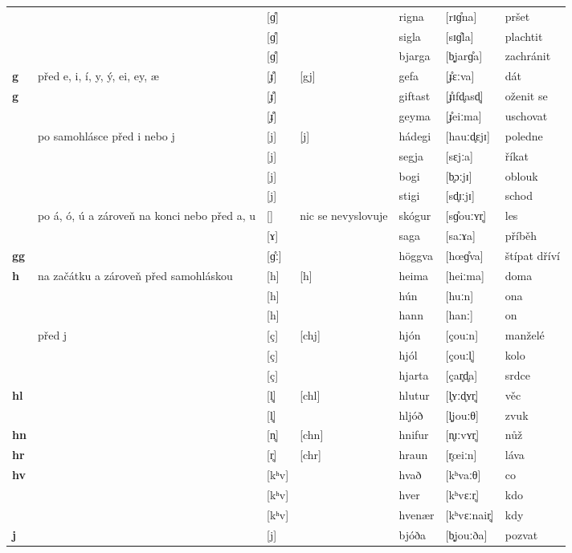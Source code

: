 \begin{longtable}{>{\bfseries}lX>{\IPAfont}lXl>{\IPAfont}ll}
 &  & {[ɡ̊]} &  & rigna & {[rɪɡ̊na]} & pršet \\ 
 &  & {[ɡ̊]} &   & sigla & {[sɪɡ̊la]} & plachtit \\ 
 &  & {[ɡ̊]} &   & bjarga & {[b̥jarɡ̊a]} & zachránit \\ 
g  & před e, i, í, y, ý, ei, ey, æ & {[\r ɟ]} & [gj] & gefa & {[\r ɟɛːva]} & dát \\ 
g &  & {[\r ɟ]} &   & giftast & {[\r ɟɪfd̥asd̥]} & oženit se \\ 
 &  & {[\r ɟ]} &   & geyma & {[\r ɟeiːma]} & uschovat \\ 
 & po samohlásce před i nebo j & {[j]} & [j] & hádegi & {[hauːd̥ɛjɪ]} & poledne \\ 
 &  & {[j]} &   & segja & {[sɛjːa]} & říkat \\ 
 &  & {[j]} &   & bogi & {[b̥ɔːjɪ]} & oblouk \\ 
 &  & {[j]} &   & stigi & {[sd̥ɪːjɪ]} & schod \\ 
 & po á, ó, ú a zároveň na konci nebo před a, u & {[]} & nic se nevyslovuje & skógur & {[sɡ̊ouːʏr̥]} & les \\ 
 &  & {[ɤ]} &   & saga & {[saːɤa]} & příběh \\ 
gg &  & {[ɡ̊ː]} &   & höggva & {[h\oe ɡ̊va]} & štípat dříví \\ 
h & na začátku a zároveň před samohláskou & {[h]} & [h] & heima & {[heiːma]} & doma \\ 
 &  & {[h]} &   & hún & {[huːn]} & ona \\ 
 &  & {[h]} &   & hann & {[hanː]} & on  \\ 
 & před j & {[ç]} & [chj] & hjón & {[çouːn]} & manželé \\ 
 &  & {[ç]} &  & hjól & {[çouːl̥]} & kolo \\ 
 &  & {[ç]} &  & hjarta & {[çar̥d̥a]} & srdce \\ 
hl &  & {[l̥]} & [chl] & hlutur & {[l̥ʏːd̥ʏr̥]} & věc \\ 
 &  & {[l̥]} &  & hljóð & {[l̥jouːθ]} & zvuk \\ 
hn &  & {[n̥]} & [chn] & hnifur & {[n̥ɪːvʏr̥]} & nůž \\ 
hr &  & {[r̥]} & [chr] & hraun & {[r̥\oe iːn]} & láva \\ 
hv &  & {[kʰv]} & & hvað & {[kʰvaːθ]} & co \\ 
 &  & {[kʰv]} &   & hver & {[kʰvɛːr̥]} & kdo \\ 
 &  & {[kʰv]} &   & hvenær & {[kʰvɛːnair̥]} & kdy \\ 
j &  & {[j]} &   & bjóða & {[b̥jouːða]} & pozvat \\ 

\end{longtable}
